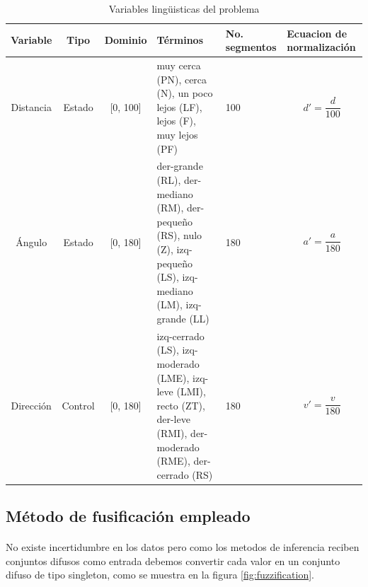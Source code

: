 \documentclass[a4paper,10pt]{article}
\begin{document}
\begin{table}[htb]%
	\begin{center}
		 \begin{tabular}{| c | c | c |p{3.5cm}| p{2cm} | p{2.5cm} |}
			  \hline
			    Variable & Tipo & Dominio & Términos & No. segmentos & Ecuacion de normalización \\ \hline
			    Distancia & Estado & [0, 100] & muy cerca (PN), \newline cerca (N), \newline un poco lejos (LF), \newline lejos (F), \newline muy lejos (PF) & 100 &  $$ d' = \frac{d}{100} $$ \\ \hline
			    Ángulo & Estado & [0, 180] & der-grande (RL), \newline der-mediano (RM), \newline der-pequeño (RS), \newline nulo (Z), \newline izq-pequeño (LS), \newline 					izq-mediano (LM), \newline izq-grande (LL) & 180 &  $$a' = \frac{a}{180}$$ \\ \hline
			    Dirección & Control & [0, 180] & izq-cerrado (LS), \newline izq-moderado (LME), \newline izq-leve (LMI), \newline recto (ZT), \newline der-leve (RMI), \newline 				der-moderado (RME), \newline der-cerrado (RS) & 180 & $$ v' = \frac{v}{180} $$ \\ \hline
		  \end{tabular}		  
		  \caption{Variables lingüisticas del problema  \label{tab:lv}}%
	\end{center}
\end{table}

\subsection{Método de fusificación empleado}\label{sub:fuzzification}
\paragraph{} No existe incertidumbre en los datos pero como los metodos de inferencia reciben conjuntos difusos como entrada debemos convertir cada valor
en un conjunto difuso de tipo singleton, como se muestra en la figura \ref{fig:fuzzification}.
\end{document}
